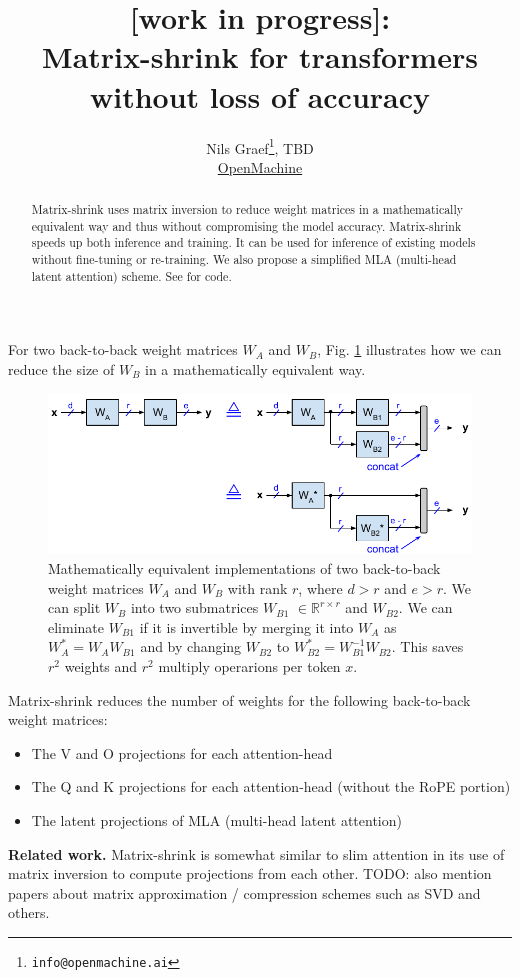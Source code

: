 \documentclass{article}
\title{[work in progress]: \\ Matrix-shrink for transformers without loss of accuracy}
\author{Nils Graef\thanks{\texttt{info@openmachine.ai}}, TBD \\
  \href{https://openmachine.ai}{OpenMachine}}
\newcommand{\eR}[2]{$\in \mathbb{R}^{#1 \times #2}$}  %
\begin{document}
 \maketitle

\begin{abstract}
Matrix-shrink uses matrix inversion to reduce weight matrices in a mathematically equivalent way and thus without compromising the model accuracy. Matrix-shrink speeds up both inference and training. It can be used for inference of existing models without fine-tuning or re-training. We also propose a simplified MLA (multi-head latent attention) scheme. See \citep{tricks} for code.
\end{abstract}

For two back-to-back weight matrices $W_A$ and $W_B$, Fig. \ref{fig1} illustrates how we can reduce the size of $W_B$ in a mathematically equivalent way.
\begin{figure}[h!] \centering  %
  \includegraphics[scale=0.88]{../doc/fig/matShrink_fig1.pdf}
  \caption{Mathematically equivalent implementations of two back-to-back weight matrices $W_A$ and $W_B$ with rank $r$, where $d > r$ and $e > r$. We can split $W_B$ into two submatrices $W_{B1}$ \eR{r}{r} and $W_{B2}$. We can eliminate $W_{B1}$ if it is invertible by merging it into $W_A$ as $W_A^\ast = W_A W_{B1}$ and by changing $W_{B2}$ to $W_{B2}^\ast = W_{B1}^{-1} W_{B2}$. This saves $r^2$ weights and $r^2$ multiply operarions per token $x$.}
\label{fig1} \end{figure}

Matrix-shrink reduces the number of weights for the following back-to-back weight matrices:

\begin{itemize}[topsep=-1pt, itemsep=-1pt]
  \item The V and O projections for each attention-head
  \item The Q and K projections for each attention-head (without the RoPE portion)
  \item The latent projections of MLA (multi-head latent attention)
\end{itemize}
\textbf{Related work.} Matrix-shrink is somewhat similar to slim attention \citep{slimAttn} in its use of matrix inversion to compute projections from each other. TODO: also mention papers about matrix approximation / compression schemes such as SVD and others.
\end{document}
